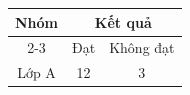 \documentclass[12pt]{article}
\begin{document}
\begin{tabular}{|c|c|c|}
\hline
\multirow{2}{*}{Nhóm} & \multicolumn{2}{c|}{Kết quả} \\ \cline{2-3}
 & Đạt & Không đạt \\ \hline
Lớp A & 12 & 3 \\ \hline
\end{tabular}
\end{document}
